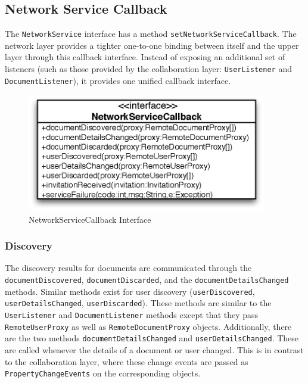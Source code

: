 \subsection{Network Service Callback}
The \texttt{NetworkService} interface has a method 
\texttt{setNetworkServiceCallback}. The network layer provides a tighter
one-to-one binding between itself and the upper layer through this
callback interface. Instead of exposing an additional set of listeners
(such as those provided by the collaboration layer: \texttt{UserListener}
and \texttt{DocumentListener}), it provides one unified callback interface.

\begin{figure}[H]
 \centering
 \includegraphics[width=10.44cm,height=5.15cm]{../images/finalreport/architecture_networkservicecallback_uml.eps}
 \caption{NetworkServiceCallback Interface}
\end{figure}


\subsubsection{Discovery}
The discovery results for documents are communicated through the 
\texttt{documentDiscovered},
\texttt{documentDiscarded}, and the
\texttt{documentDetailsChanged} methods. Similar methods exist for user
discovery (\texttt{userDiscovered}, \texttt{userDetailsChanged}, 
\texttt{userDiscarded}). These methods are similar to the 
\texttt{UserListener} and \texttt{DocumentListener} methods except that they
pass \texttt{RemoteUserProxy} as well as \texttt{RemoteDocumentProxy} 
objects. Additionally, there are the two methods \texttt{documentDetailsChanged}
and \texttt{userDetailsChanged}. These are called whenever the details of
a document or user changed. This is in contrast to the collaboration layer,
where these change events are passed as \texttt{PropertyChangeEvents} on 
the corresponding objects.

